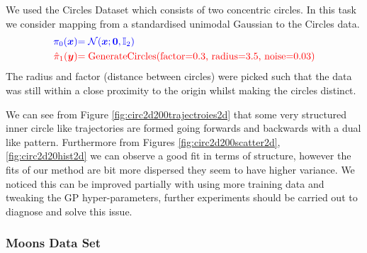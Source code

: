 \documentclass[a4paper,12pt,twoside,openright]{report}
\theoremstyle{definition}
\begin{document}
We  used the Circles Dataset \citep{pedregosa2011scikit} which consists of two concentric circles. In this task we consider mapping from a standardised unimodal Gaussian to the Circles data.
\begin{align*}
     \color{blue}{\pi_0({\bm{x}})} &\color{blue}{= {\mathcal{N}}({\bm{x}}; {\bm{0}},  \mathbb{I}_2)} \\
    \color{red}{\hat{\pi}_1({\bm{y}})} &\color{red}{= \text{GenerateCircles(factor=0.3, radius=3.5, noise=0.03)}}
\end{align*}
The radius and factor (distance between circles) were picked such that the data was still within a close proximity to the origin whilst making the circles distinct.

We can see from Figure \ref{fig:circ2d200trajectroies2d} that some very structured inner circle like trajectories are formed going forwards and backwards with a dual like pattern. Furthermore from Figures \ref{fig:circ2d200scatter2d}, \ref{fig:circ2d20hist2d} we can observe a good fit in terms of structure, however the fits of our method are  bit more dispersed they seem to have higher variance. We noticed this can be improved partially with using more training data and tweaking the GP hyper-parameters, further experiments should be carried out to diagnose and solve this issue. 


\subsubsection{Moons Data Set}
\end{document}
